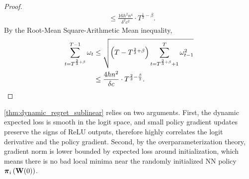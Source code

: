 \begin{proof}
\begin{equation*}
\begin{split}
    &\le \frac{16 h^2 n^4}{\delta^2 c^2} \cdot T^{\frac{1}{3} - \beta}.
\end{split}
\end{equation*}
By the Root-Mean Square-Arithmetic Mean inequality,
\begin{equation*}
\begin{split}
    \sum\limits_{t=T^{\frac{2}{3}+ \beta}}^{T-1}{\omega_{t}} &\le \sqrt{\left(T  - T^{\frac{2}{3}+ \beta} \right) \sum\limits_{t=T^{\frac{2}{3}+ \beta}+1}^{T}{\omega_{t-1}^2}} \\
    &\le \frac{4 h n^2}{\delta c} \cdot T^{\frac{2}{3} - \frac{\beta}{2}}. \qedhere
\end{split}
\end{equation*}    
\end{proof}



\cref{thm:dynamic_regret_sublinear} relies on two arguments. First, the dynamic expected loss is smooth in the logit space, and small policy gradient updates preserve the signs of ReLU outputs, therefore highly correlates the logit derivative and the policy gradient. Second, by the overparameterization theory, gradient norm is lower bounded by expected loss around initialization, which means there is no bad local minima near the randomly initialized NN policy ${\boldsymbol{\pi}}_i\left( {\mathbf{W}}(0) \right)$.

